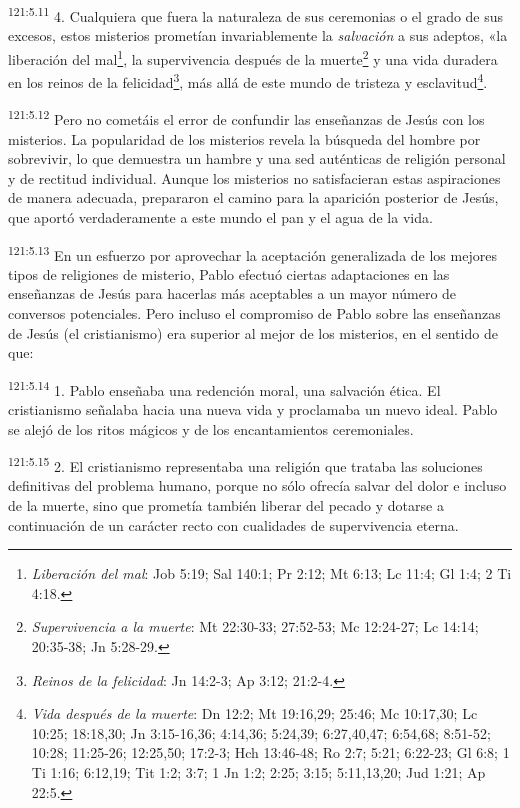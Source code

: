 \par
\textsuperscript{121:5.11} 4. Cualquiera que fuera la naturaleza de sus ceremonias o el grado de sus excesos, estos misterios prometían invariablemente la \textit{salvación} a sus adeptos, «la liberación del mal\footnote{\textit{Liberación del mal}: Job 5:19; Sal 140:1; Pr 2:12; Mt 6:13; Lc 11:4; Gl 1:4; 2 Ti 4:18.}, la supervivencia después de la muerte\footnote{\textit{Supervivencia a la muerte}: Mt 22:30-33; 27:52-53; Mc 12:24-27; Lc 14:14; 20:35-38; Jn 5:28-29.} y una vida duradera en los reinos de la felicidad\footnote{\textit{Reinos de la felicidad}: Jn 14:2-3; Ap 3:12; 21:2-4.}, más allá de este mundo de tristeza y esclavitud\footnote{\textit{Vida después de la muerte}: Dn 12:2; Mt 19:16,29; 25:46; Mc 10:17,30; Lc 10:25; 18:18,30; Jn 3:15-16,36; 4:14,36; 5:24,39; 6:27,40,47; 6:54,68; 8:51-52; 10:28; 11:25-26; 12:25,50; 17:2-3; Hch 13:46-48; Ro 2:7; 5:21; 6:22-23; Gl 6:8; 1 Ti 1:16; 6:12,19; Tit 1:2; 3:7; 1 Jn 1:2; 2:25; 3:15; 5:11,13,20; Jud 1:21; Ap 22:5.}.

\par
\textsuperscript{121:5.12} Pero no cometáis el error de confundir las enseñanzas de Jesús con los misterios. La popularidad de los misterios revela la búsqueda del hombre por sobrevivir, lo que demuestra un hambre y una sed auténticas de religión personal y de rectitud individual. Aunque los misterios no satisfacieran estas aspiraciones de manera adecuada, prepararon el camino para la aparición posterior de Jesús, que aportó verdaderamente a este mundo el pan y el agua de la vida.

\par
\textsuperscript{121:5.13} En un esfuerzo por aprovechar la aceptación generalizada de los mejores tipos de religiones de misterio, Pablo efectuó ciertas adaptaciones en las enseñanzas de Jesús para hacerlas más aceptables a un mayor número de conversos potenciales. Pero incluso el compromiso de Pablo sobre las enseñanzas de Jesús (el cristianismo) era superior al mejor de los misterios, en el sentido de que:

\par
\textsuperscript{121:5.14} 1. Pablo enseñaba una redención moral, una salvación ética. El cristianismo señalaba hacia una nueva vida y proclamaba un nuevo ideal. Pablo se alejó de los ritos mágicos y de los encantamientos ceremoniales.

\par
\textsuperscript{121:5.15} 2. El cristianismo representaba una religión que trataba las soluciones definitivas del problema humano, porque no sólo ofrecía salvar del dolor e incluso de la muerte, sino que prometía también liberar del pecado y dotarse a continuación de un carácter recto con cualidades de supervivencia eterna.

